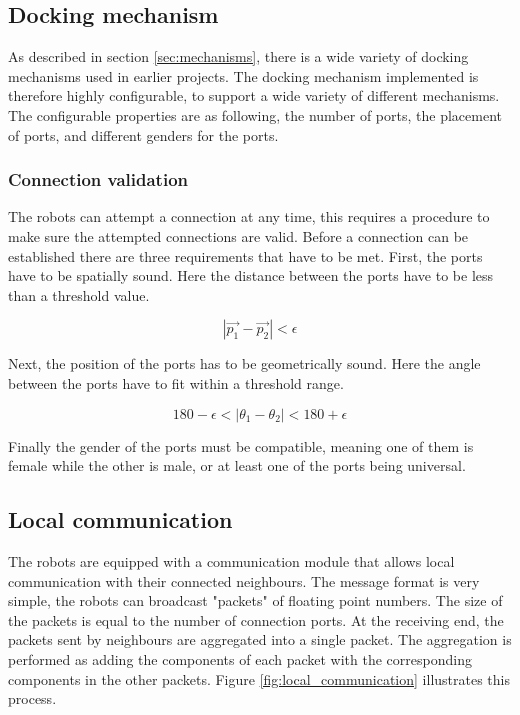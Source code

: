 	 
\subsection{Docking mechanism}
As described in section \ref{sec:mechanisms}, there is a wide variety of docking mechanisms used in earlier projects.
The docking mechanism implemented is therefore highly configurable, to support a wide variety of different mechanisms.
The configurable properties are as following, the number of ports, the placement of ports, and different genders for the ports. 
	
\subsubsection{Connection validation}
The robots can attempt a connection at any time, this requires a procedure to make sure the attempted connections are valid.
Before a connection can be established there are three requirements that have to be met.
First, the ports have to be spatially sound. 
Here the distance between the ports have to be less than a threshold value.
		
\begin{equation}
	|\vec{p_1} - \vec{p_2}| < \epsilon
\end{equation}
		
Next, the position of the ports has to be geometrically sound.
Here the angle between the ports have to fit within a threshold range.
		
\begin{equation}
	180 - \epsilon < |\theta_1 - \theta_2| < 180 + \epsilon
\end{equation}
		
Finally the gender of the ports must be compatible, meaning one of them is female while the other is male, or at least one of the ports being universal.
		
\subsection{Local communication}
The robots are equipped with a communication module that allows local communication with their connected neighbours.
The message format is very simple, the robots can broadcast "packets" of floating point numbers.
The size of the packets is equal to the number of connection ports.
At the receiving end, the packets sent by neighbours are aggregated into a single packet.
The aggregation is performed as adding the components of each packet with the corresponding components in the other packets. Figure \ref{fig:local_communication} illustrates this process.
	
